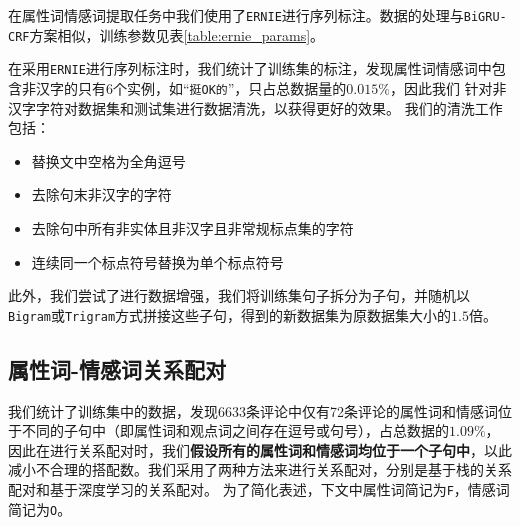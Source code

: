 \documentclass[11pt,a4paper]{article}
\begin{document}
在属性词情感词提取任务中我们使用了\texttt{ERNIE}进行序列标注。数据的处理与\texttt{BiGRU-CRF}方案相似，训练参数见表\ref{table:ernie_params}。
\begin{table}[h!]
  \begin{center}
  \end{center}
  \caption{\label{table:ernie_params} \texttt{ERNIE}参数 }
\end{table}

在采用\texttt{ERNIE}进行序列标注时，我们统计了训练集的标注，发现属性词情感词中包含非汉字的只有6个实例，如“\texttt{挺OK的}”，只占总数据量的$0.015\%$，因此我们
针对非汉字字符对数据集和测试集进行数据清洗，以获得更好的效果。
我们的清洗工作包括：

\begin{itemize}
  \item 替换文中空格为全角逗号
  \item 去除句末非汉字的字符
  \item 去除句中所有非实体且非汉字且非常规标点集的字符
  \item 连续同一个标点符号替换为单个标点符号
\end{itemize}

此外，我们尝试了进行数据增强，我们将训练集句子拆分为子句，并随机以\texttt{Bigram}或\texttt{Trigram}方式拼接这些子句，得到的新数据集为原数据集大小的$1.5$倍。

\subsection{属性词-情感词关系配对}

我们统计了训练集中的数据，发现6633条评论中仅有72条评论的属性词和情感词位于不同的子句中（即属性词和观点词之间存在逗号或句号），占总数据的$1.09\%$，
因此在进行关系配对时，我们\textbf{假设所有的属性词和情感词均位于一个子句中}，以此减小不合理的搭配数。我们采用了两种方法来进行关系配对，分别是基于栈的关系配对和基于深度学习的关系配对。
为了简化表述，下文中属性词简记为\texttt{F}，情感词简记为\texttt{O}。
\end{document}
